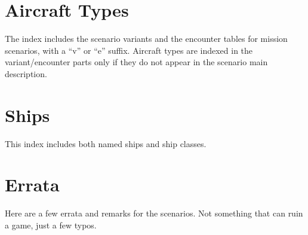 \documentclass[a4paper,twocolumn]{article}
\begin{document}
\section*{Aircraft Types}

The index includes the scenario variants and the encounter
tables for mission scenarios, with a ``v'' or ``e''
suffix. Aircraft types are indexed in the variant/encounter parts only if they do not appear in the
scenario main description.

\vspace{2mm}

\begin{hangparas}{4mm}{1}
\end{hangparas}

\section*{Ships}

This index includes both named ships and ship classes.

\vspace{2mm}

\begin{hangparas}{4mm}{1}
\end{hangparas}

\section*{Errata}

Here are a few errata and remarks for the scenarios. Not something that can ruin a game, just
a few typos.

\vspace{3mm}

\begin{hangparas}{4mm}{1}
\end{hangparas}
\end{document}

